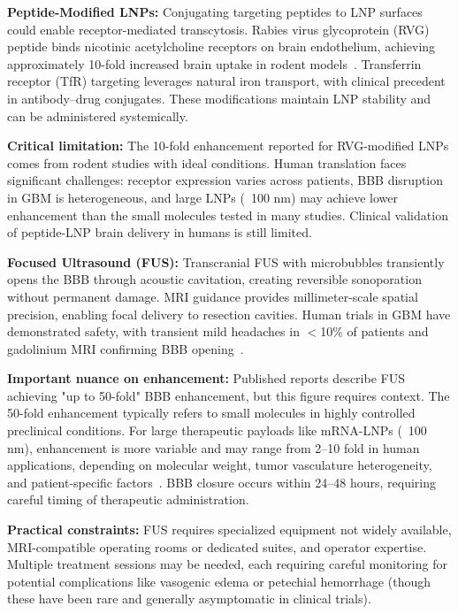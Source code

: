 \documentclass[12pt]{article}
\begin{document}
\textbf{Peptide-Modified LNPs:} Conjugating targeting peptides to LNP surfaces could enable receptor-mediated transcytosis. Rabies virus glycoprotein (RVG) peptide binds nicotinic acetylcholine receptors on brain endothelium, achieving approximately 10-fold increased brain uptake in rodent models~\citep{han2025}. Transferrin receptor (TfR) targeting leverages natural iron transport, with clinical precedent in antibody--drug conjugates. These modifications maintain LNP stability and can be administered systemically.

\textbf{Critical limitation:} The 10-fold enhancement reported for RVG-modified LNPs comes from rodent studies with ideal conditions. Human translation faces significant challenges: receptor expression varies across patients, BBB disruption in GBM is heterogeneous, and large LNPs (~100 nm) may achieve lower enhancement than the small molecules tested in many studies. Clinical validation of peptide-LNP brain delivery in humans is still limited.

\textbf{Focused Ultrasound (FUS):} Transcranial FUS with microbubbles transiently opens the BBB through acoustic cavitation, creating reversible sonoporation without permanent damage. MRI guidance provides millimeter-scale spatial precision, enabling focal delivery to resection cavities. Human trials in GBM have demonstrated safety, with transient mild headaches in $<$10\% of patients and gadolinium MRI confirming BBB opening~\citep{shen2024,manfredi2024}. 

\textbf{Important nuance on enhancement:} Published reports describe FUS achieving "up to 50-fold" BBB enhancement, but this figure requires context. The 50-fold enhancement typically refers to small molecules in highly controlled preclinical conditions. For large therapeutic payloads like mRNA-LNPs (~100 nm), enhancement is more variable and may range from 2--10 fold in human applications, depending on molecular weight, tumor vasculature heterogeneity, and patient-specific factors~\citep{chen2024fus,meng2020}. BBB closure occurs within 24--48 hours, requiring careful timing of therapeutic administration.

\textbf{Practical constraints:} FUS requires specialized equipment not widely available, MRI-compatible operating rooms or dedicated suites, and operator expertise. Multiple treatment sessions may be needed, each requiring careful monitoring for potential complications like vasogenic edema or petechial hemorrhage (though these have been rare and generally asymptomatic in clinical trials).
\end{document}
